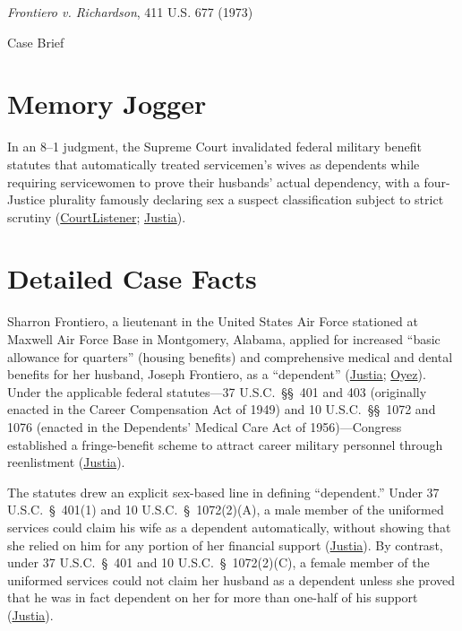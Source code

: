 \documentclass[12pt]{article}
\begin{document}
\begin{center}
{\LARGE \textit{Frontiero v. Richardson}, 411 U.S. 677 (1973)\par}
\vspace{0.8em}
{\large Case Brief\par}
\end{center}
\vspace{1em}

\section{Memory Jogger}
In an 8--1 judgment, the Supreme Court invalidated federal military benefit statutes that automatically treated servicemen's wives as dependents while requiring servicewomen to prove their husbands' actual dependency, with a four-Justice plurality famously declaring sex a suspect classification subject to strict scrutiny (\href{https://www.courtlistener.com/opinion/108781/frontiero-v-richardson/}{CourtListener}; \href{https://supreme.justia.com/cases/federal/us/411/677/}{Justia}).

\section{Detailed Case Facts}
Sharron Frontiero, a lieutenant in the United States Air Force stationed at Maxwell Air Force Base in Montgomery, Alabama, applied for increased ``basic allowance for quarters'' (housing benefits) and comprehensive medical and dental benefits for her husband, Joseph Frontiero, as a ``dependent'' (\href{https://supreme.justia.com/cases/federal/us/411/677/}{Justia}; \href{https://www.oyez.org/cases/1972/71-1694}{Oyez}). Under the applicable federal statutes---37 U.S.C.~\S\S~401 and 403 (originally enacted in the Career Compensation Act of 1949) and 10 U.S.C.~\S\S~1072 and 1076 (enacted in the Dependents' Medical Care Act of 1956)---Congress established a fringe-benefit scheme to attract career military personnel through reenlistment (\href{https://supreme.justia.com/cases/federal/us/411/677/}{Justia}).

The statutes drew an explicit sex-based line in defining ``dependent.'' Under 37 U.S.C.~\S~401(1) and 10 U.S.C.~\S~1072(2)(A), a male member of the uniformed services could claim his wife as a dependent automatically, without showing that she relied on him for any portion of her financial support (\href{https://supreme.justia.com/cases/federal/us/411/677/}{Justia}). By contrast, under 37 U.S.C.~\S~401 and 10 U.S.C.~\S~1072(2)(C), a female member of the uniformed services could not claim her husband as a dependent unless she proved that he was in fact dependent on her for more than one-half of his support (\href{https://supreme.justia.com/cases/federal/us/411/677/}{Justia}).
\end{document}
